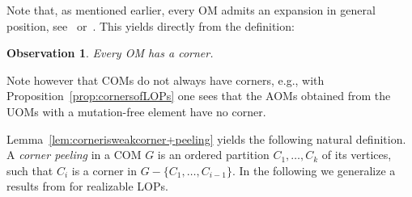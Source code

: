 \documentclass[final,11pt]{article}
\newtheorem{lem}[thm]{Lemma}%
\newtheorem{obs}[thm]{Observation}
\begin{document}
Note that, as mentioned earlier, every OM admits an expansion in general position, see~\cite[Lemma 1.7]{San-02} or~\cite[Proposition 7.2.2]{bjvestwhzi-93}. This yields directly from the definition:
\begin{obs}
 Every OM has a corner.
\end{obs}

Note however that COMs do not always have corners, e.g., with Proposition~\ref{prop:cornersofLOPs} one sees that the AOMs obtained from the UOMs with a mutation-free element have no corner.


%  
%  
% 

Lemma~\ref{lem:cornerisweakcorner+peeling} yields the following natural definition.
A \emph{corner peeling} in a COM $G$ is an ordered partition $C_1, \ldots, C_k$ of its vertices, such that $C_i$ is a corner in $G - \{C_1,\ldots, C_{i-1}\}$.
In the following we generalize a results from \cite{Tra-04} for realizable LOPs. 
\end{document}
